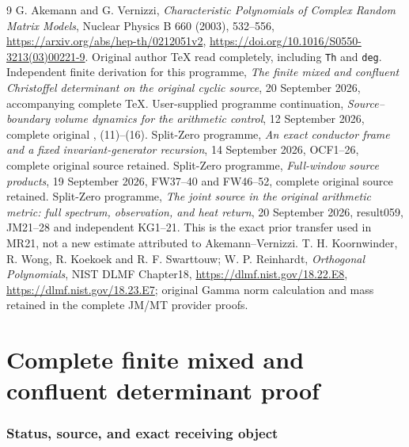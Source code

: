 \begin{thebibliography}{9}
 G. Akemann and G. Vernizzi,
\emph{Characteristic Polynomials of Complex Random Matrix Models},
Nuclear Physics B 660 (2003), 532--556,
\url{https://arxiv.org/abs/hep-th/0212051v2},
\url{https://doi.org/10.1016/S0550-3213(03)00221-9}.
Original author TeX read completely, including \texttt{Th} and \texttt{deg}.
 Independent finite derivation for this programme,
\emph{The finite mixed and confluent Christoffel determinant on the
original cyclic source}, 20 September 2026, accompanying complete TeX.
 User-supplied programme continuation,
\emph{Source--boundary volume dynamics for the arithmetic control},
12 September 2026, complete original , (11)--(16).
 Split-Zero programme,
\emph{An exact conductor frame and a fixed invariant-generator recursion},
14 September 2026, OCF1--26, complete original source retained.
 Split-Zero programme,
\emph{Full-window source products}, 19 September 2026,
FW37--40 and FW46--52, complete original source retained.
 Split-Zero programme,
\emph{The joint source in the original arithmetic metric: full spectrum,
observation, and heat return}, 20 September 2026, result059,
JM21--28 and independent KG1--21. This is the exact prior transfer
used in MR21, not a new estimate attributed to Akemann--Vernizzi.
 T. H. Koornwinder, R. Wong, R. Koekoek and R. F. Swarttouw;
W. P. Reinhardt, \emph{Orthogonal Polynomials}, NIST DLMF Chapter18,
\url{https://dlmf.nist.gov/18.22.E8},
\url{https://dlmf.nist.gov/18.23.E7}; original Gamma norm calculation
and mass retained in the complete JM/MT provider proofs.
\end{thebibliography}

\endgroup

\clearpage\begingroup
\part*{Complete finite mixed and confluent determinant proof}
\newtheorem{mrfinitetheorem}{Theorem}
\newtheorem{mrfinitelemma}[mrfinitetheorem]{Lemma}
\newcommand{\mrfiniteC}{\mathbb C}
\newcommand{\mrfiniteR}{\mathbb R}
\newcommand{\mrfinitePp}{\mathcal P}
\newcommand{\mrfinitedd}{\,d}



\section{Status, source, and exact receiving object}\label{mrfinite:sec:status}

